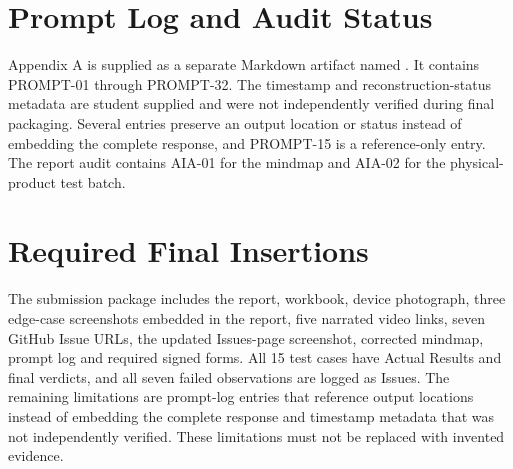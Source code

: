 \section{Prompt Log and Audit Status}

Appendix A is supplied as a separate Markdown artifact named . It contains PROMPT-01 through PROMPT-32. The timestamp and reconstruction-status metadata are student supplied and were not independently verified during final packaging. Several entries preserve an output location or status instead of embedding the complete response, and PROMPT-15 is a reference-only entry. The report audit contains AIA-01 for the mindmap and AIA-02 for the physical-product test batch.

\section{Required Final Insertions}

The submission package includes the report, workbook, device photograph, three edge-case screenshots embedded in the report, five narrated video links, seven GitHub Issue URLs, the updated Issues-page screenshot, corrected mindmap, prompt log and required signed forms. All 15 test cases have Actual Results and final verdicts, and all seven failed observations are logged as Issues. The remaining limitations are prompt-log entries that reference output locations instead of embedding the complete response and timestamp metadata that was not independently verified. These limitations must not be replaced with invented evidence.
